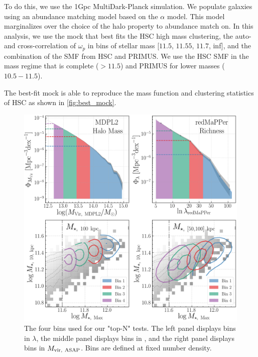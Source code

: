 \documentclass[a4paper,fleqn,usenatbib]{mnras}
\begin{document}
To do this, we use the 1Gpc MultiDark-Planck simulation. We populate galaxies using an abundance
matching model based on the \citet{Lehmann2017} $\alpha$ model. This model marginalizes over the
choice of the halo property to abundance match on. In this analysis, we use the mock that best
fits the HSC high mass clustering, the auto- and cross-correlation of $\omega_p$ in bins of
stellar mass [$11.5$, $11.55$, $11.7$, inf], and the combination of the SMF from HSC and PRIMUS.
We use the HSC SMF in the mass regime that is complete ($> 11.5$) and PRIMUS for lower masses
($10.5 - 11.5$).

The best-fit mock is able to reproduce the mass function and clustering statistics of HSC as
shown in \ref{fig:best_mock}.

  \begin{figure}
      \centering 
      \includegraphics[width=\textwidth]{figure/topn_bins}
      \caption{The four bins used for our "top-N" tests. The left panel displays bins in
        $\lambda$, the middle panel displays bins in \mmax{}, and the right panel displays bins in
        $M_{\rm vir,\ ASAP}$. Bins are defined at fixed number density. }
      \label{fig:density_bins}
  \end{figure}
\end{document}
